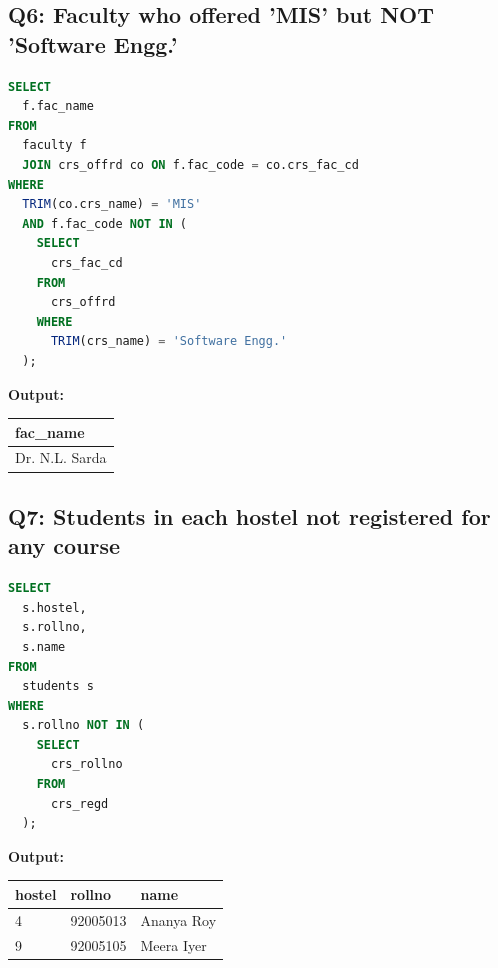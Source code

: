\documentclass[11pt, a4paper]{article}
\begin{document}
\subsection*{Q6: Faculty who offered 'MIS' but NOT 'Software Engg.'}
\begin{lstlisting}[language=SQL]
SELECT
  f.fac_name
FROM
  faculty f
  JOIN crs_offrd co ON f.fac_code = co.crs_fac_cd
WHERE
  TRIM(co.crs_name) = 'MIS'
  AND f.fac_code NOT IN (
    SELECT
      crs_fac_cd
    FROM
      crs_offrd
    WHERE
      TRIM(crs_name) = 'Software Engg.'
  );
\end{lstlisting}
\vspace{0.3cm}
\textbf{Output:}\vspace{0.2cm}
\begin{center}
\begin{tabular}{|l|}
\hline
\textbf{fac\_name} \\ \hline
Dr. N.L. Sarda                 \\ \hline
\end{tabular}
\end{center}
\newpage
\subsection*{Q7: Students in each hostel not registered for any course}
\begin{lstlisting}[language=SQL]
SELECT
  s.hostel,
  s.rollno,
  s.name
FROM
  students s
WHERE
  s.rollno NOT IN (
    SELECT
      crs_rollno
    FROM
      crs_regd
  );
\end{lstlisting}
\vspace{0.3cm}
\textbf{Output:}\vspace{0.2cm}
\begin{center}
\begin{tabular}{|l|l|l|}
\hline
\textbf{hostel} & \textbf{rollno} & \textbf{name} \\ \hline
4 & 92005013 & Ananya Roy                     \\ \hline
9 & 92005105 & Meera Iyer                     \\ \hline
\end{tabular}
\end{center}
\newpage
\end{document}

